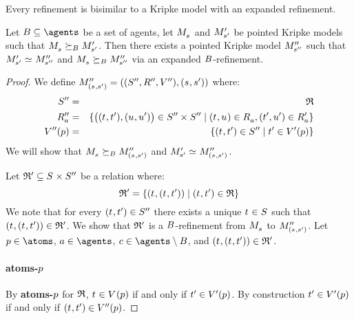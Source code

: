 Every refinement is bisimilar to a Kripke model with an expanded refinement.

\begin{lemma}\label{refinement-expansion}
Let $\agentsB \subseteq \agents$ be a set of agents, let $\kPModel{\kStateS}$ and ${M^{\prime}_{{s}^{\prime}}}$ be pointed Kripke models such that $\kPModel{\kStateS} \simulatesBs \kPModelP{\kStateSP}$.
Then there exists a pointed Kripke model ${M^{\prime\prime}_{{s}^{\prime\prime}}}$ such that $\kPModelP{\kStateSP} \bisimilar \kPModelPP{\kStateSPP}$ and $\kPModel{\kStateS} \simulatesBs \kPModelPP{\kStateSPP}$ via an expanded $B$-refinement.
\end{lemma}

\begin{proof}
We define $\kPModelAndTuplePP{(\kStateS, \kStateSP)}$ where:
\begin{eqnarray*}
    \kStatesPP &=& \refinement\\
    \kAccessibilityPPA &=& \{\big((\kStateT, \kStateTP), (\kStateU, \kStateUP)\big) \in \kStatesPP \times \kStatesPP \mid (\kStateT, \kStateU) \in \kAccessibilityA, (\kStateTP, \kStateUP) \in \kAccessibilityPA\}\\
    \kValuationPP(\atomP) &=& \{(\kStateT, \kStateTP) \in \kStatesPP \mid \kStateTP \in \kValuationP(\atomP)\}
\end{eqnarray*}
We will show that $\kPModel{\kStateS} \simulatesBs \kPModelPP{(\kStateS, \kStateSP)}$ and $\kPModelP{\kStateSP} \bisimilar \kPModelPP{(\kStateS, \kStateSP)}$.

Let $\refinement' \subseteq \kStates \times \kStatesPP$ be a relation where:
$$
\refinement' = \{(\kStateT, (\kStateT, \kStateTP)) \mid (\kStateT, \kStateTP) \in \refinement\}
$$
We note that for every $(\kStateT, \kStateTP) \in \kStatesPP$ there exists a unique $\kStateT \in \kStates$ such that $(\kStateT, (\kStateT, \kStateTP)) \in \refinement'$.
We show that $\mathfrak{R}'$ is a $B$-refinement from $\kPModel{\kStateS}$ to $\kPModelPP{(\kStateS, \kStateSP)}$.
Let $\atomP \in \atoms$, $\agentA \in \agents$, $\agentC \in \agents \setminus \agentsB$, and $(\kStateT, (\kStateT, \kStateTP)) \in \refinement'$.

\paragraph{atoms-$p$}
By {\bf atoms-$p$} for $\mathfrak{R}$, $\kStateT \in \kValuation(\atomP)$ if and only if ${t}^{\prime} \in {V^{\prime}}(p)$.
By construction ${t}^{\prime} \in {V^{\prime}}(p)$ if and only if $(\kStateT, \kStateTP) \in \kValuationPP(\atomP)$.


\end{proof}
